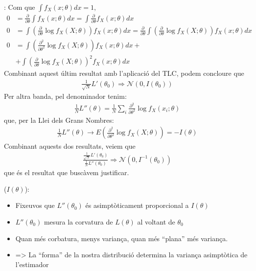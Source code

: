 \documentclass[letterpaper,10pt,english]{sphinxmanual}
\begin{document}
: Com que \(\int f_X(x;\theta)dx = 1\),
\begin{equation*}
\begin{split}0 & = \frac{\partial}{\partial \theta} \int f_X(x;\theta)dx = \int  \frac{\partial}{\partial \theta} f_X(x;\theta) dx\\
0 & = \int  (\frac{\partial}{\partial \theta} \log f_X(X;\theta))  f_X(x;\theta) dx = \frac{\partial}{\partial \theta} \int  (\frac{\partial}{\partial \theta} \log f_X(X;\theta))  f_X(x;\theta) dx \\
0 & = \int  (\frac{\partial^2}{\partial \theta^2} \log f_X(X;\theta))  f_X(x;\theta)dx + \\
  & + \int (\frac{\partial}{\partial \theta} \log f_X(X;\theta))^2 f_X(x;\theta)dx\end{split}
\end{equation*}
Combinant aquest últim resultat amb l’aplicació del TLC, podem concloure que
\begin{equation*}
\begin{split}\frac{1}{\sqrt{N}} L'(\theta_0) \Rightarrow \mathcal{N}(0, I(\theta_0))\end{split}
\end{equation*}
Per altra banda, pel denominador tenim:
\begin{equation*}
\begin{split}\frac{1}{N} L''(\theta) = \frac{1}{N} \sum_i \frac{\partial^2}{\partial \theta^2} \log f_X(x_i;\theta)\end{split}
\end{equation*}
que, per la Llei dels Grans Nombres:
\begin{equation*}
\begin{split}\frac{1}{N} L''(\theta) \to E(\frac{\partial^2}{\partial \theta^2} \log f_X(X;\theta)) = -I(\theta)\end{split}
\end{equation*}
Combinant aquests dos resultats, veiem que
\begin{equation*}
\begin{split}\frac{\frac{1}{\sqrt{N}} L'(\theta_0)}{ \frac{1}{N} L''(\theta_0)} \Rightarrow  \mathcal{N}(0, I^{-1}(\theta_0))\end{split}
\end{equation*}
que és el resultat que buscàvem justificar.

 (\(I(\theta)\)):
\begin{itemize}
\item {} 
Fixeu\sphinxhyphen{}vos que  \(L''(\theta_0)\) és asimptòticament proporcional a \(I(\theta)\)

\item {} 
\(L''(\theta_0)\) mesura la corvatura de \(L(\theta)\) al voltant de \(\theta_0\)

\item {} 
Quan més corbatura, menys variança, quan més “plana” més variança.

\item {} 
=\textgreater{} La “forma” de la nostra distribució determina la variança asimptòtica de l’estimador

\end{itemize}
\end{document}
